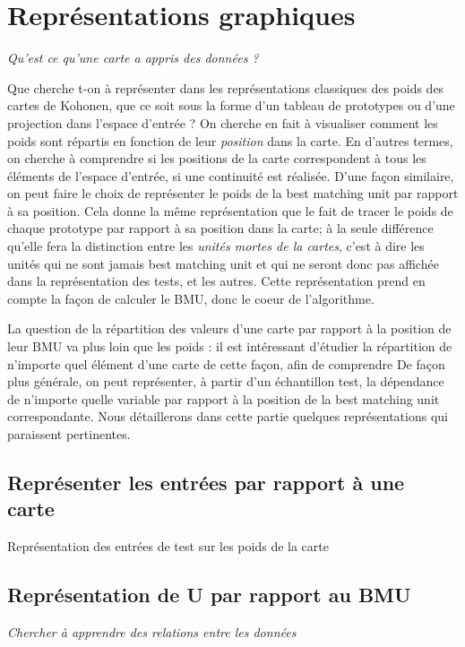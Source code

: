 \section{Représentations graphiques}

\emph{Qu'est ce qu'une carte a appris des données ? }

Que cherche t-on à représenter dans les représentations classiques des poids des cartes de Kohonen, que ce soit sous la forme d'un tableau de prototypes ou d'une projection dans l'espace d'entrée ? On cherche en fait à visualiser comment les poids sont répartis en fonction de leur \emph{position} dans la carte. En d'autres termes, on cherche à comprendre si les positions de la carte correspondent à tous les éléments de l'espace d'entrée, si une continuité est réalisée. 
D'une façon similaire, on peut faire le choix de représenter le poids de la best matching unit par rapport à sa position. Cela donne la même représentation que le fait de tracer le poids de chaque prototype par rapport à sa position dans la carte; à la seule différence qu'elle fera la distinction entre les \emph{unités mortes de la cartes}, c'est à dire les unités qui ne sont jamais best matching unit et qui ne seront donc pas affichée dans la représentation des tests, et les autres.
Cette représentation prend en compte la façon de calculer le BMU, donc le coeur de l'algorithme.

La question de la répartition des valeurs d'une carte par rapport à la position de leur BMU va plus loin que les poids : il est intéressant d'étudier la répartition de n'importe quel élément d'une carte de cette façon, afin de comprendre 
De façon plus générale, on peut représenter, à partir d'un échantillon test, la dépendance de n'importe quelle variable par rapport à la position de la best matching unit correspondante. Nous détaillerons dans cette partie quelques représentations qui paraissent pertinentes.


\subsection{Représenter les entrées par rapport à une carte}

Représentation des entrées de test sur les poids de la carte

\subsection{Représentation de U par rapport au BMU}
\emph{Chercher à apprendre des relations entre les données}

